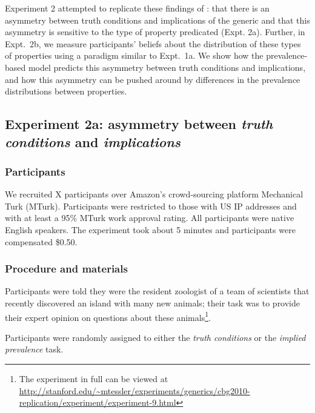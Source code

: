 \documentclass[10pt,letterpaper]{article}
\begin{document}
Experiment 2 attempted to replicate these findings of : that there is an asymmetry between truth conditions and implications of the generic and that this asymmetry is sensitive to the type of property predicated (Expt. 2a). Further, in Expt.~2b, we measure participants' beliefs about the distribution of these types of properties using a paradigm similar to Expt.~1a. We show how the prevalence-based model predicts this asymmetry between truth conditions and implications, and how this asymmetry can be pushed around by differences in the prevalence distributions between properties.


\subsection{Experiment 2a: asymmetry between \emph{truth conditions} and \emph{implications}}


\subsubsection{Participants}

We recruited X participants over Amazon's crowd-sourcing platform Mechanical Turk (MTurk).  Participants were restricted to those with US IP addresses and with at least a 95\% MTurk work approval rating. All participants were native English speakers. The experiment took about 5 minutes and participants were compensated \$0.50.

\subsubsection{Procedure and materials}

Participants were told they were the resident zoologist of a team of scientists that recently discovered an island with many new animals; their task was to provide their expert opinion on questions about these animals\footnote{The experiment in full can be viewed at \url{http://stanford.edu/~mtessler/experiments/generics/cbg2010-replication/experiment/experiment-9.html}}. 

Participants were randomly assigned to either the \emph{truth conditions} or the \emph{implied prevalence} task.
\end{document}
